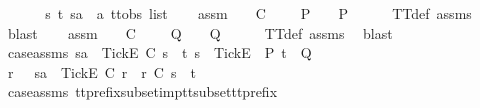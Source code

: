 \begin{isabellebody}
\ \ \isamarkupfalse%
\isanewline
{}\isamarkupfalse%
\isanewline
\ \ \isamarkupfalse%
\ s\ t\ sa\ {\isacharcolon}{\isacharcolon}\ {\isachardoublequoteopen}{\isacharprime}a\ ttobs\ list{\isachardoublequoteclose}\isanewline
\ \ \isamarkupfalse%
\ assm{}{\isacharcolon}\ {\isachardoublequoteopen}{\isasymforall}{\isasymrho}\ {\isasymsigma}{\isachardot}\ {\isasymrho}\ {\isasymlesssim}\isactrlsub C\ {\isasymsigma}\ {\isasymand}\ {\isasymsigma}\ {\isasymin}\ P\ {\isasymlongrightarrow}\ {\isasymrho}\ {\isasymin}\ P{\isachardoublequoteclose}\isanewline
\ \ \ \ \isamarkupfalse%
\ TT{}{\isacharunderscore}def\ assms{\isacharparenleft}{}{\isacharparenright}\ \isamarkupfalse%
\ blast\isanewline
\ \ \isamarkupfalse%
\ assm{}{\isacharcolon}\ {\isachardoublequoteopen}{\isasymforall}{\isasymrho}\ {\isasymsigma}{\isachardot}\ {\isasymrho}\ {\isasymlesssim}\isactrlsub C\ {\isasymsigma}\ {\isasymand}\ {\isasymsigma}\ {\isasymin}\ Q\ {\isasymlongrightarrow}\ {\isasymrho}\ {\isasymin}\ Q{\isachardoublequoteclose}\isanewline
\ \ \ \ \isamarkupfalse%
\ TT{}{\isacharunderscore}def\ assms{\isacharparenleft}{}{\isacharparenright}\ \isamarkupfalse%
\ blast\isanewline
\ \ \isamarkupfalse%
\ case{\isacharunderscore}assms{\isacharcolon}\ {\isachardoublequoteopen}sa\ {\isacharat}\ {\isacharbrackleft}{\isacharbrackleft}Tick{\isacharbrackright}\isactrlsub E{\isacharbrackright}\ {\isasymlesssim}\isactrlsub C\ s\ {\isacharat}\ t{\isachardoublequoteclose}\ {\isachardoublequoteopen}s\ {\isacharat}\ {\isacharbrackleft}{\isacharbrackleft}Tick{\isacharbrackright}\isactrlsub E{\isacharbrackright}\ {\isasymin}\ P{\isachardoublequoteclose}\ {\isachardoublequoteopen}t\ {\isasymin}\ Q{\isachardoublequoteclose}\isanewline
\ \ \isamarkupfalse%
\ r\ \ {}{\isacharcolon}\ {\isachardoublequoteopen}sa\ {\isacharat}\ {\isacharbrackleft}{\isacharbrackleft}Tick{\isacharbrackright}\isactrlsub E{\isacharbrackright}\ {\isasymsubseteq}\isactrlsub C\ r\ {\isasymand}\ r\ {\isasymle}\isactrlsub C\ s\ {\isacharat}\ t{\isachardoublequoteclose}\isanewline
\ \ \ \ \isamarkupfalse%
\ case{\isacharunderscore}assms{\isacharparenleft}{}{\isacharparenright}\ tt{\isacharunderscore}prefix{\isacharunderscore}subset{\isacharunderscore}imp{\isacharunderscore}tt{\isacharunderscore}subset{\isacharunderscore}tt{\isacharunderscore}prefix\ \isamarkupfalse%

\end{isabellebody}
